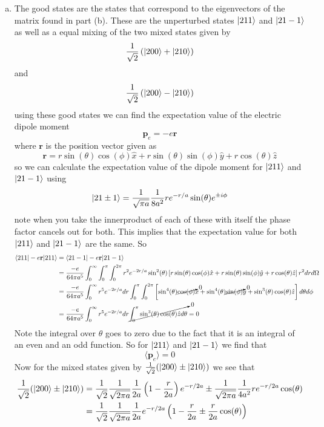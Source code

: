 \documentclass[11pt]{article}
\numberwithin{equation}{section}
\begin{document}
\begin{enumerate}[(a)]
\item
The good states are the states that correspond to the eigenvectors of the matrix found in part (b). These are the unperturbed states $|{211}\rangle$ and $|{21-1}\rangle$ as well as a equal mixing of the two mixed states given by 
$$\frac{1}{\sqrt{2}}\left(|{200}\rangle+|{210}\rangle\right)$$
and
$$\frac{1}{\sqrt{2}}\left(|{200}\rangle-|{210}\rangle\right)$$
using these good states we can find the expectation value of the electric dipole moment 
$$\mathbf{p}_e = -e\mathbf{r}$$
where $\mathbf{r}$ is the position vector given as 
$$\mathbf{r} = r\sin(\theta)\cos(\phi)\hat{x} + r\sin(\theta)\sin(\phi)\hat{y} + r\cos(\theta)\hat{z}$$
so we can calculate the expectation value of the dipole moment for $|{211}\rangle$ and $|{21-1}\rangle$ using
$$|{21\pm1}\rangle = \frac{1}{\sqrt{\pi a}}\frac{1}{8a^2}re^{-r/a}\sin(\theta)e^{\pm i\phi}$$
note when you take the innerproduct of each of these with itself the phase factor cancels out for both. This implies that the expectation value for both $|{211}\rangle$ and $|{21-1}\rangle$ are the same. So 
\begin{align*}
\langle{211}|-e\mathbf{r}|{211}\rangle &= \langle{21-1}|-e\mathbf{r}|{21-1}\rangle\\ 
&= \frac{-e}{64\pi a^5}\int_{0}^{\infty}\int_{0}^{\pi}\int_{0}^{2\pi} r^2e^{-2r/a}\sin^2(\theta)\left[r\sin(\theta)\cos(\phi)\hat{x} + r\sin(\theta)\sin(\phi)\hat{y} + r\cos(\theta)\hat{z}\right]r^2drd\Omega\\
&= \frac{-e}{64\pi a^5}\int_{0}^{\infty} r^5e^{-2r/a}dr\int_{0}^{\pi}\int_{0}^{2\pi}\left[\sin^4(\theta)\cancelto{0}{\cos(\phi)}\hat{x} + \sin^4(\theta)\cancelto{0}{\sin(\phi)}\hat{y} + \sin^3(\theta)\cos(\theta)\hat{z}\right]d\theta d\phi\\
&= \frac{-e}{64\pi a^5}\int_{0}^{\infty} r^5e^{-2r/a}dr\cancelto{0}{\int_{0}^{\pi}\sin^3(\theta)\cos(\theta)\hat{z}d\theta} = 0
\end{align*}
Note the integral over $\theta$ goes to zero due to the fact that it is an integral of an even and an odd function. So for $|{211}\rangle$ and $|{21-1}\rangle$ we find that
$$\langle\mathbf{p}_e\rangle = 0$$
Now for the mixed states given by $\frac{1}{\sqrt{2}}(|{200}\rangle\pm|{210}\rangle)$ we see that
\begin{align*}
\frac{1}{\sqrt{2}}(\ket{200}\pm\ket{210}) &= \frac{1}{\sqrt{2}}\frac{1}{\sqrt{2\pi a}}\frac{1}{2a}\left(1-\frac{r}{2a}\right)e^{-r/2a} \pm \frac{1}{\sqrt{2\pi a}}\frac{1}{4a^2}re^{-r/2a}\cos(\theta)\\ 
&= \frac{1}{\sqrt{2}}\frac{1}{\sqrt{2\pi a}}\frac{1}{2a}e^{-r/2a}\left(1-\frac{r}{2a} \pm \frac{r}{2a}\cos(\theta)\right)\\ 

\end{align*}
\end{enumerate}
\end{document}
